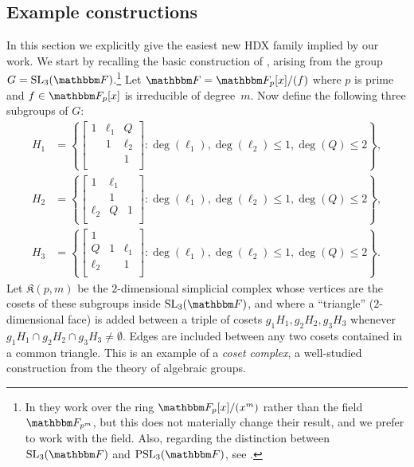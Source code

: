 \documentclass[10pt,a4paper]{article}
\theoremstyle{definition}
\newcommand{\F}{\mathbbm F}
\newcommand{\SL}{{\mathrm{SL}}}
\newcommand{\PSL}{{\mathrm{PSL}}}
\newcommand{\complex}{\mathfrak{K}}
\begin{document}
\subsection{Example constructions}  \label{sec:eg}
In this section we explicitly give the easiest new HDX family implied by our work.
We start by recalling the basic construction of \cite{KO18}, arising from the group $G = \SL_3(\F)$.\footnote{In \cite{KO18} they work over the ring $\F_p[x]/(x^m)$ rather than the field~$\F_{p^m}$, but this does not materially change their result, and we prefer to work with the field.  Also, regarding the distinction between $\SL_3(\F)$ and $\PSL_3(\F)$, see .}
Let $\F = \F_p[x]/( f )$ where $p$ is prime and $f \in \F_p[x]$ is irreducible of degree~$m$.
Now define the following three subgroups of $G$:
\begin{align*}
H_1 &= \left \{\begin{bmatrix}
1 & \ell_1 & Q \\
 & 1 & \ell_2 \\
 &  & 1\\
\end{bmatrix} : \deg(\ell_1) , \deg(\ell_2) \le 1, \deg(Q) \le 2 \right \},\\
H_2 &= \left \{ \begin{bmatrix}
1 & \ell_1 &  \\
 & 1 &  \\
\ell_2 & Q & 1\\
\end{bmatrix}: \deg(\ell_1) , \deg(\ell_2) \le 1, \deg(Q) \le 2 \right \},\\
H_3 &= \left \{ \begin{bmatrix}
1 &  & \\
Q & 1 & \ell_1 \\
\ell_2 &  & 1\\
\end{bmatrix} : \deg(\ell_1) , \deg(\ell_2) \le 1, \deg(Q) \le 2 \right \}.
\end{align*}
Let $\complex(p,m)$ be the $2$-dimensional simplicial complex whose vertices are the cosets of these subgroups inside $\SL_3(\F)$, and where a ``triangle'' ($2$-dimensional face) is added between a triple of cosets $g_1 H_1,g_2 H_2,g_3 H_3$ whenever $g_1 H_1 \cap g_2 H_2 \cap g_3 H_3 \neq \emptyset$. Edges are included between any two cosets contained in a common triangle. This is an example of a \emph{coset complex}, a well-studied construction from the theory of algebraic groups.
\end{document}
